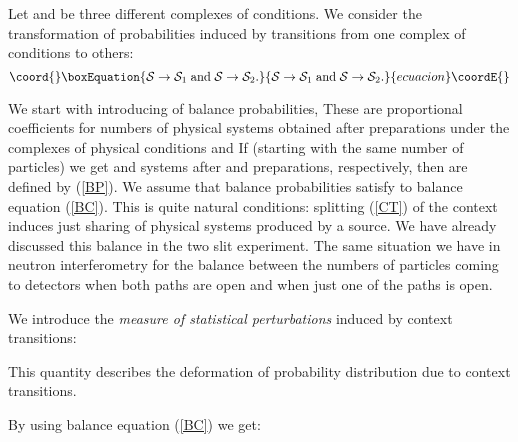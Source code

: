 \documentclass[12pt,oneside,final,a4paper]{article}
\begin{document}
Let \coordHE{} and \coordHE{} be three
different complexes of conditions. We consider the transformation of probabilities induced by transitions 
from one complex of conditions to others: 
\begin{equation}\coord{}\boxEquation{
\label{CT}
{\cal S} \rightarrow {\cal S}_1\; \mbox{and}\; {\cal S} \rightarrow {\cal S}_2.
}{
{\cal S} \rightarrow {\cal S}_1\; \mbox{and}\; {\cal S} \rightarrow {\cal S}_2.
}{ecuacion}\coordE{}\end{equation}


We start with introducing of balance probabilities,
\coordHE{}  These are proportional coefficients for numbers of physical systems
obtained after preparations under the complexes of physical conditions \coordHE{} and \coordHE{}
If (starting with the same number of particles)  we get \coordHE{} and \coordHE{} systems after  \coordHE{}
and \coordHE{} preparations, respectively, then \coordHE{}  are defined by
(\ref{BP}). We assume that balance probabilities satisfy to balance equation (\ref{BC}).
This is quite natural conditions: splitting (\ref{CT}) of the context \coordHE{} 
induces just  sharing of physical systems produced by a source. We have already
discussed this balance in the two slit experiment. The same situation we have 
in neutron interferometry  for the balance between the numbers of particles coming to detectors
when both paths are open and when just one of the paths is open.



We introduce  the {\it measure of statistical perturbations}
\myHighlight{$\delta$}\coordHE{} induced by context transitions:

\coordHE{}

This quantity describes the deformation of probability distribution \coordHE{}
due to context transitions.
\medskip

By using balance equation (\ref{BC}) we get:

\coordHE{}
\end{document}
